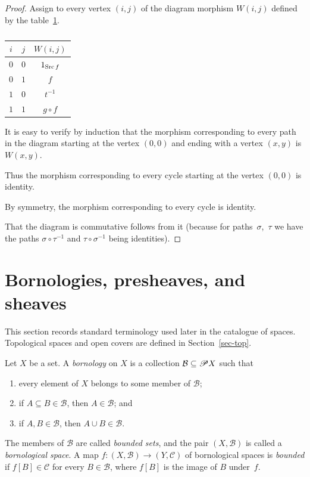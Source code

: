 \begin{proof}
Assign to every vertex $(i,j)$ of the diagram morphism $W(i,j)$
defined by the table~\ref{square-table}.

\begin{table}[ht]
\caption{\label{square-table}}
\begin{tabular}{|c|c|c|}
\hline 
$i$ & $j$ & $W(i,j)$\tabularnewline
\hline 
\hline 
$0$ & $0$ & $1_{\operatorname{Src} f}$\tabularnewline
\hline 
$0$ & $1$ & $f$\tabularnewline
\hline 
$1$ & $0$ & $t^{-1}$\tabularnewline
\hline 
$1$ & $1$ & $g\circ f$\tabularnewline
\hline 
\end{tabular}
\end{table}


It is easy to verify by induction that the morphism corresponding to
every path in the diagram starting at the vertex $(0,0)$ and ending
with a vertex $(x,y)$ is $W(x,y)$.

Thus the morphism corresponding to every cycle starting at the vertex
$(0,0)$ is identity.

By symmetry, the morphism corresponding to every cycle is identity.

That the diagram is commutative follows from it (because for paths~$\sigma$,~$\tau$
we have the paths $\sigma\circ\tau^{-1}$ and $\tau\circ\sigma^{-1}$
being identities).
\end{proof}

\section{Bornologies, presheaves, and sheaves}
\label{sec-common-bornologies-presheaves}

This section records standard terminology used later in the catalogue
of spaces. Topological spaces and open covers are defined in
Section~\ref{sec-top}.

\begin{defn}
Let $X$ be a set. A \emph{bornology} on $X$ is a collection
$\mathcal{B}\subseteq\mathscr{P} X$ such that
\begin{enumerate}
\item every element of $X$ belongs to some member of $\mathcal{B}$;
\item if $A\subseteq B\in\mathcal{B}$, then $A\in\mathcal{B}$; and
\item if $A,B\in\mathcal{B}$, then $A\cup B\in\mathcal{B}$.
\end{enumerate}
The members of $\mathcal{B}$ are called \emph{bounded sets}, and the
pair $(X,\mathcal{B})$ is called a \emph{bornological space}. A map
$f:(X,\mathcal{B})\to(Y,\mathcal{C})$ of bornological spaces is
\emph{bounded} if $f[B]\in\mathcal{C}$ for every $B\in\mathcal{B}$,
where $f[B]$ is the image of $B$ under~$f$.
\end{defn}

